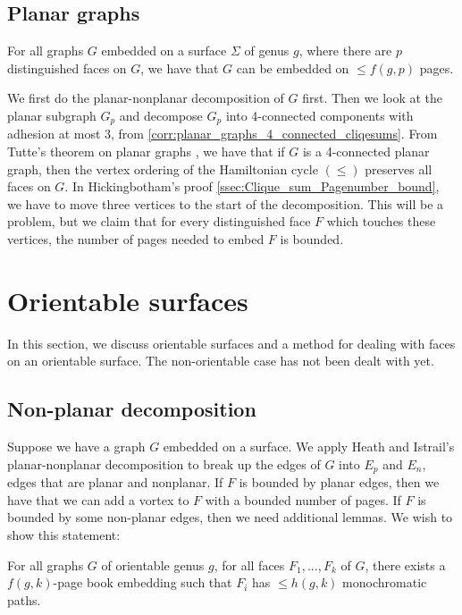 \subsection{Planar graphs}
\begin{conjecture}\label{conj:4-planar graphs}
	For all graphs $G$ embedded on a surface $\Sigma$ of genus $g$, where there are $p$ distinguished faces on $G$, we have that $G$ can be embedded on $\leq f(g, p)$ pages.
\end{conjecture}
We first do the planar-nonplanar decomposition of $G$ first. 
Then we look at the planar subgraph $G_p$ and decompose $G_p$ into 4-connected components with adhesion at most 3, from \cref{corr:planar_graphs_4_connected_cliqesums}. 
From Tutte's theorem on planar graphs \cite{tutteTheoremPlanarGraphs1956}, we have that if $G$ is a 4-connected planar graph, then the vertex ordering of the Hamiltonian cycle $(\leq)$ preserves all faces on $G$.
In Hickingbotham's proof \cref{ssec:Clique_sum_Pagenumber_bound}, we have to move three vertices to the start of the decomposition. This will be a problem, but we claim that for every distinguished face $F$ which touches these vertices, the number of pages needed to embed $F$ is bounded. 

\section{Orientable surfaces}
In this section, we discuss orientable surfaces and a method for dealing with faces on an orientable surface. The non-orientable case has not been dealt with yet. 
\subsection{Non-planar decomposition}
Suppose we have a graph $G$ embedded on a surface. We apply Heath and Istrail's planar-nonplanar decomposition \cite{heathPagenumberGenusGraphs1992} to break up the edges of $G$ into $E_p$ and $E_n$, edges that are planar and nonplanar. If $F$ is bounded by planar edges, then we have that we can add a vortex to $F$ with a bounded number of pages. If $F$ is bounded by some non-planar edges, then we need additional lemmas.
We wish to show this statement:
\begin{theorem}
	For all graphs $G$ of orientable genus $g$, for all faces $F_1, ..., F_k$ of $G$, there exists a $f(g, k)$-page book embedding such that $F_i$ has $\leq h(g, k)$ monochromatic paths.
\end{theorem}

